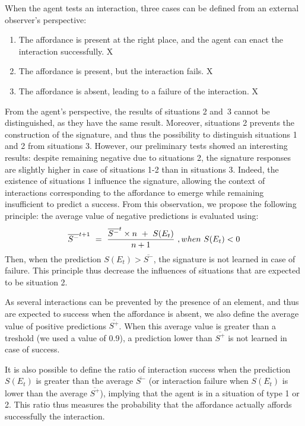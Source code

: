 \documentclass[conference]{IEEEtran}
\begin{document}
When the agent tests an interaction, three cases can be defined from an external observer's perspective:
\begin{enumerate}
\item The affordance is present at the right place, and the agent can enact the interaction successfully. X
\item The affordance is present, but the interaction fails. X
\item The affordance is absent, leading to a failure of the interaction. X
\end{enumerate}
From the agent's perspective, the results of situations 2 and~3 cannot be distinguished, as they have the same result. Moreover, situations 2 prevents the construction of the signature, and thus the possibility to distinguish situations 1 and 2 from situations 3.
However, our preliminary tests showed an interesting results: despite remaining negative due to situations 2, the signature responses are slightly higher in case of situations 1-2 than in situations 3. Indeed, the existence of situations 1 influence the signature, allowing the context of interactions corresponding to the affordance to emerge while remaining insufficient to predict a success. From this observation, we propose the following principle: the average value of negative predictions is evaluated using:
\begin{equation}
\overline{S^-}^{t+1}~=~{{\overline{S^-}^{t} \times n ~+~ S(E_t)} \over{n+1}}~, when~ S(E_t)<0
\end{equation}
Then, when the prediction $S(E_t)>\overline{S^-}$, the signature is not learned in case of failure. This principle thus decrease the influences of situations that are expected to be situation 2. %

As several interactions can be prevented by the presence of an element, and thus are expected to success when the affordance is absent, we also define the average value of positive predictions $\overline{S^+}$. When this average value is greater than a treshold (we used a value of 0.9), a prediction lower than $\overline{S^+}$ is not learned in case of success.

It is also possible to define the ratio of interaction success when the prediction $S(E_t)$ is greater than the average $\overline{S^-}$ (or interaction failure when $S(E_t)$ is lower than the average $\overline{S^+}$), implying that the agent is in a situation of type 1 or 2. This ratio thus measures the probability that the affordance actually affords successfully the interaction.
\end{document}
